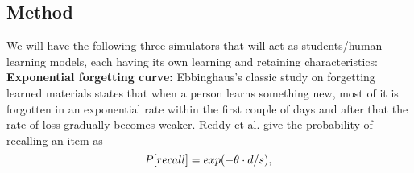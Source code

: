 \documentclass[12pt]{article}
\begin{document}
\subsection{Method}

We will have the following three simulators that will act as students/human learning models, each having its own learning and retaining characteristics:
\vspace{5mm}
\newline
\textbf{Exponential forgetting curve:}
\newline
{\color{blue}Ebbinghaus's \cite{ebbi}}classic study on forgetting learned materials states that when a person learns something new, most of it is forgotten in an exponential rate within the first couple of days and after that the rate of loss gradually becomes weaker.
\newline
{\color{blue}Reddy et al. \cite{leitner_reddy} give} the probability of recalling an item as \\

\begin{equation} \label{eq:efc}
P[recall] = exp (-\theta \cdot d/s),\\
\end{equation}
\end{document}
